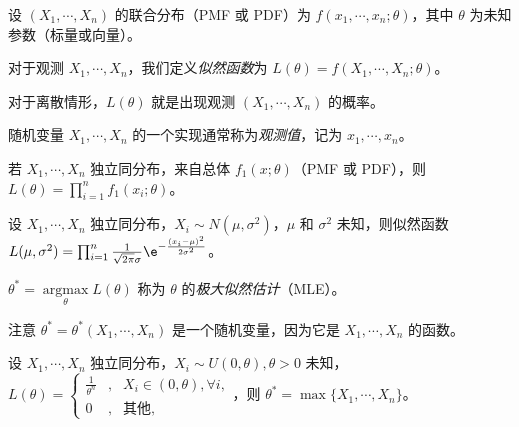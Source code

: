 \documentclass[../main.tex]{subfiles}
\begin{document}
设 $(X_1,\cdots,X_n)$ 的联合分布（PMF 或 PDF）为 $f(x_1,\cdots,x_n;\theta)$，其中 $\theta$ 为未知参数（标量或向量）。

对于观测 $X_1,\cdots,X_n$，我们定义\emph{似然函数}为 $L(\theta)=f(X_1,\cdots,X_n;\theta)$。

对于离散情形，$L(\theta)$ 就是出现观测 $(X_1,\cdots,X_n)$ 的概率。

随机变量 $X_1,\cdots,X_n$ 的一个实现通常称为\emph{观测值}，记为 $x_1,\cdots,x_n$。

若 $X_1,\cdots,X_n$ 独立同分布，来自总体 $f_1(x;\theta)$（PMF 或 PDF），则 $L(\theta)=\prod_{i=1}^nf_1(x_i;\theta)$。

\begin{example}
    设 $X_1,\cdots,X_n$ 独立同分布，$X_i\sim N(\mu,\sigma^2)$，$\mu$ 和 $\sigma^2$ 未知，则似然函数 $L(\mu,\sigma^2)=\prod_{i=1}^n\frac1{\sqrt{2\pi}\sigma}\e^{-\frac{(x_i-\mu)^2}{2\sigma^2}}$。
\end{example}

\begin{definition}\label{def:6.2.1}
    $\theta^*=\underset{\theta}{\operatorname{argmax}} L(\theta)$ 称为 $\theta$ 的\emph{极大似然估计}（MLE）。
\end{definition}

注意 $\theta^*=\theta^*(X_1,\cdots,X_n)$ 是一个随机变量，因为它是 $X_1,\cdots,X_n$ 的函数。

\begin{example}
    设 $X_1,\cdots,X_n$ 独立同分布，$X_i\sim U(0,\theta),\theta>0$ 未知，$L(\theta)=\left\{
        \begin{aligned}
            \frac1{\theta^n} & , & X_i\in (0,\theta),\forall i, \\
            0                & , & \text{其他},
        \end{aligned}\right.$，则 $\theta^*=\max\{X_1,\cdots,X_n\}$。
\end{example}
\end{document}
